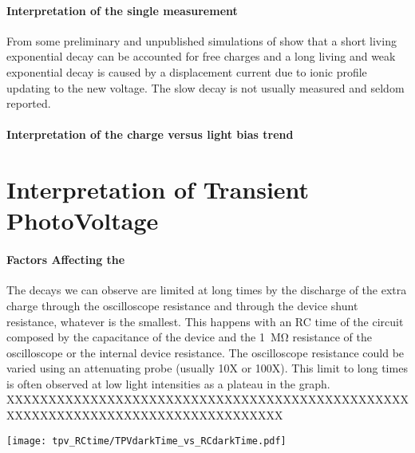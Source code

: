 \paragraph{Interpretation of the single measurement}
From some preliminary and unpublished simulations of  show that a short living exponential decay can be accounted for free charges and a long living and weak exponential decay is caused by a displacement current due to ionic profile updating to the new voltage. The slow decay is not usually measured and seldom reported\cite{ORegan2015b}.

\paragraph{Interpretation of the charge versus light bias trend}


\section{Interpretation of Transient PhotoVoltage}\label{interpretation_tpv}

\paragraph{Factors Affecting the }
The decays we can observe are limited at long times by the discharge of the extra charge through the oscilloscope resistance and through the device shunt resistance, whatever is the smallest. This happens with an RC time of the circuit composed by the capacitance of the device and the \SI{1}{\Mohm} resistance of the oscilloscope or the internal device resistance. The oscilloscope resistance could be varied using an attenuating probe (usually 10X or 100X). This limit to long times is often observed at low light intensities as a plateau in the  graph. XXXXXXXXXXXXXXXXXXXXXXXXXXXXXXXXXXXXXXXXXXXXXXXXXXXXXXXXXXXXXXXXXXXXXXXXXXXXXXXXX

\begin{SCfigure}
	\centering
	\texttt{[image: tpv\_RCtime/TPVdarkTime\_vs\_RCdarkTime.pdf]}
	\label{fig:tpv_RCtime}
\end{SCfigure}

